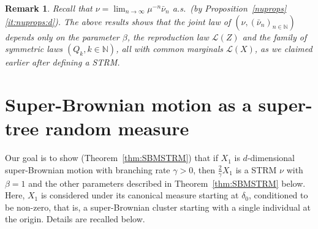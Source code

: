 \documentclass[12pt]{article}
\numberwithin{theorem}{section}
\newtheorem{remark}[theorem]{Remark}
\theoremstyle{def}
\numberwithin{equation}{section}
\newcommand{\N}{\mathbb{N}}
\newcommand{\cL}{\mathcal{L}}
\begin{document}
\begin{remark}\label{rem:Qklaw}
Recall that $\nu=\lim_{n\to\infty}\mu^{-n}\bar\nu_n$ a.s.\ (by Proposition~\ref{nuprops}\ref{it:nuprops:d}).  
The above results shows that the joint law of $\left(\nu,(\bar\nu_n)_{n\in\N}\right)$ depends only on the parameter $\beta$, the reproduction law $\cL(Z)$ and the family of symmetric laws $\left(Q_k,k\in\N\right)$, all with common marginals $\cL(X)$, as we claimed earlier after defining a STRM.
\end{remark}

\section{Super-Brownian motion as a super-tree random measure}\label{sec:SBM}

Our goal is to show (Theorem~\ref{thm:SBMSTRM}) that if $X_1$ is $d$-dimensional super-Brownian motion with branching rate $\gamma>0$, then $\frac{2}{\gamma}X_1$ is a STRM $\nu$ with $\beta=1$ and the other parameters described in Theorem~\ref{thm:SBMSTRM} below.
Here, $X_1$ is considered under its canonical measure starting at $\delta_0$, conditioned to be non-zero, that is, a super-Brownian cluster starting with a single individual at the origin. Details are  recalled below. %
\end{document}

